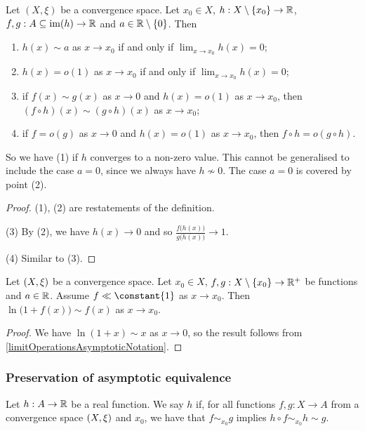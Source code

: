 \begin{lemma} \label{limitOperationsAsymptoticNotation}
Let $(X,\xi)$ be a convergence space. Let $x_0 \in X$, $h: X\setminus\{x_0\}\to \mathbb{R}$, $f,g: A\subseteq \operatorname{im}(h) \to \mathbb{R}$ and $a\in \mathbb{R}\setminus\{0\}$. Then
\begin{enumerate}
\item $h(x) \sim a$ as $x\to x_0$ \textup{if and only if} $\lim_{x\to x_0}h(x) = 0$;
\item $h(x) = o(1)$ as $x\to x_0$ \textup{if and only if} $\lim_{x\to x_0}h(x) = 0$;
\item if $f(x)\sim g(x)$ as $x\to 0$ and $h(x) = o(1)$ as $x\to x_0$, then $(f\circ h)(x) \sim (g\circ h)(x)$ as $x\to x_0$;
\item if $f = o(g)$ as $x\to 0$ and $h(x) = o(1)$ as $x\to x_0$, then $f\circ h = o(g\circ h)$.
\end{enumerate}
\end{lemma}
So we have (1) if $h$ converges to a non-zero value. This cannot be generalised to include the case $a=0$, since we always have $h \nsim 0$. The case $a=0$ is covered by point (2).
\begin{proof}
(1), (2) are restatements of the definition.

(3) By (2), we have $h(x) \to 0$ and so $\frac{f\big(h(x)\big)}{g\big(h(x)\big)} \to 1$.

(4) Similar to (3).
\end{proof}

\begin{lemma}
Let $\sSet{X,\xi}$ be a convergence space. Let $x_0 \in X$, $f,g: X\setminus\{x_0\}\to \mathbb{R}^+$ be functions and $a\in \mathbb{R}$. Assume $f \ll \constant{1}$ as $x\to x_0$. Then $\ln\big(1+f(x)\big) \sim f(x)$ as $x\to x_0$.
\end{lemma}
\begin{proof}
We have $\ln(1+x) \sim x$ as $x\to 0$, so the result follows from \ref{limitOperationsAsymptoticNotation}.
\end{proof}

\subsubsection{Preservation of asymptotic equivalence}
\begin{definition}
Let $h: A\to \mathbb{R}$ be a real function. We say $h$  if, for all functions $f, g: X \to A$ from a convergence space $\sSet{X,\xi}$ and $x_0$, we have that $f\sim_{x_0} g$ implies $h\circ f \sim_{x_0} h\sim g$.
\end{definition}

